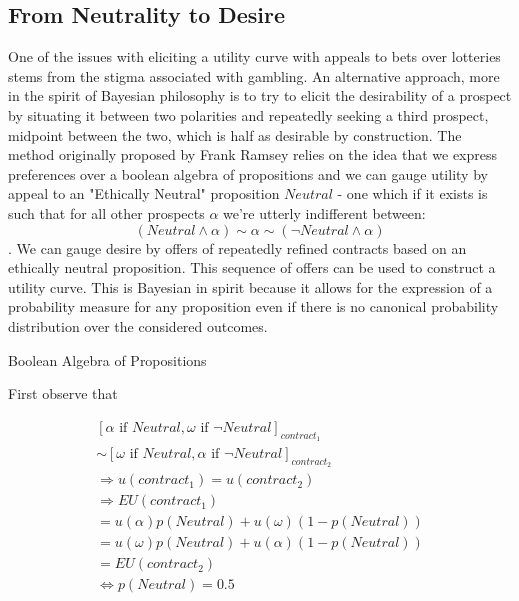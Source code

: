 \documentclass{tufte-handout}
\begin{document}
\subsection*{From Neutrality to Desire}
One of the issues with eliciting a utility curve with appeals to bets over lotteries stems from the stigma associated with gambling. An alternative approach, more in the spirit of Bayesian philosophy is to try to elicit the desirability of a prospect by situating it between two polarities and repeatedly seeking a third prospect, midpoint between the two, which is half as desirable by construction. The method originally proposed by Frank Ramsey relies on the idea that we express preferences over a boolean algebra of propositions and we can gauge utility by appeal to an "Ethically Neutral" proposition $Neutral$ - one which if it exists is such that for all other prospects $\alpha$ we're utterly indifferent between: $$(Neutral \wedge \alpha) \sim \alpha \sim (\neg Neutral \wedge \alpha)$$. \noindent  We can gauge desire by offers of repeatedly refined contracts based on an ethically neutral proposition. This sequence of offers can be used to construct a utility curve. This is Bayesian in spirit because it allows for the expression of a probability measure for any proposition even if there is no canonical probability distribution over the considered outcomes. 
\begin{marginfigure}
\caption{Boolean Algebra of Propositions}%
  
  \label{fig:boolean_algebra}%
\end{marginfigure}

\noindent First observe that 

\begin{equation}
\begin{split}
[ \alpha \text{ if } Neutral, \omega \text{ if } \neg Neutral ]_{contract_{1}} \\  \sim [ \omega  \text{ if } Neutral, \alpha \text{ if } \neg Neutral ]_{contract_{2}} \\   \Rightarrow u(contract_{1})  = u(contract_{2})   \\  \Rightarrow EU(contract_{1}) \\ = u(\alpha)p(Neutral) + u(\omega)(1-p(Neutral)) \\ 
= u(\omega)p(Neutral) + u(\alpha)(1-p(Neutral)) \\ 
= EU(contract_{2})  
\\ \Leftrightarrow p(Neutral) = 0.5
\end{split}
\end{equation}
\end{document}
